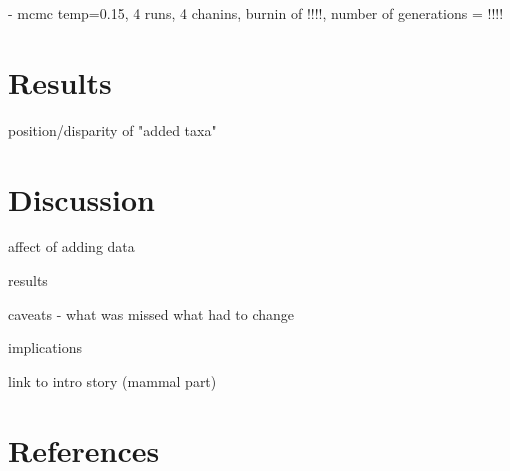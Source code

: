 \documentclass[a4paper,11pt]{article}
\begin{document}
 - mcmc temp=0.15, 4 runs, 4 chanins, burnin of !!!!, number of generations = !!!! 

\section{Results} 

position/disparity of "added taxa"

\section{Discussion}

affect of adding data

results

caveats - what was missed what had to change 

implications

link to intro story (mammal part)

 

\section{References}



\end{document}
